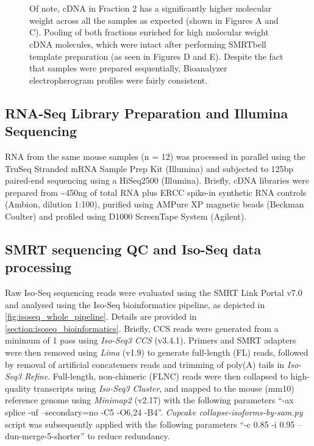 \begin{figure}[!htp]
{	\\
	\\	 	
	Of note, cDNA in Fraction 2 has a significantly higher molecular weight across all the samples as expected (shown in Figures A and C). Pooling of both fractions enriched for high molecular weight cDNA molecules, which were intact after performing SMRTbell template preparation (as seen in Figures D and E). Despite the fact that samples were prepared sequentially, Bioanalyzer electropherogram profiles were fairly consistent. 
	}
	\label{fig:isoseq_whole_bioresults}
\end{figure}

\clearpage
\subsection{RNA-Seq Library Preparation and Illumina Sequencing}
RNA from the same mouse samples (n = 12) was processed in parallel using the TruSeq Stranded mRNA Sample Prep Kit (Illumina) and subjected to 125bp paired-end sequencing using a HiSeq2500 (Illumina)\cite{Castanho2020}. Briefly, cDNA libraries were prepared from \textasciitilde450ng of total RNA plus ERCC spike-in synthetic RNA controls (Ambion, dilution 1:100), purified using AMPure XP magnetic beads (Beckman Coulter) and profiled using D1000 ScreenTape System (Agilent). 

\subsection{SMRT sequencing QC and Iso-Seq data processing}\label{ch4_methods: isoseq_data}
Raw Iso-Seq sequencing reads were evaluated using the SMRT Link Portal v7.0 and analysed using the Iso-Seq bioinformatics pipeline, as depicted in \cref{fig:isoseq_whole_pipeline}. Details are provided in \cref{section:isoseq_bioinformatics}. Briefly, CCS reads were generated from a minimum of 1 pass using \textit{Iso-Seq3 CCS} (v3.4.1). Primers and SMRT adapters were then removed using \textit{Lima} (v1.9) to generate full-length (FL) reads, followed by removal of artificial concatemers reads and trimming of poly(A) tails in \textit{Iso-Seq3 Refine}. Full-length, non-chimeric (FLNC) reads were then collapsed to high-quality transcripts using \textit{Iso-Seq3 Cluster}, and mapped to the mouse (mm10) reference genome using \textit{Minimap2} (v2.17) with the following parameters “-ax splice -uf --secondary=no -C5 -O6,24 -B4”. \textit{ Cupcake collapse-isoforms-by-sam.py} script was subsequently applied with the following parameters  “-c 0.85 -i 0.95 --dun-merge-5-shorter” to reduce redundancy. 

